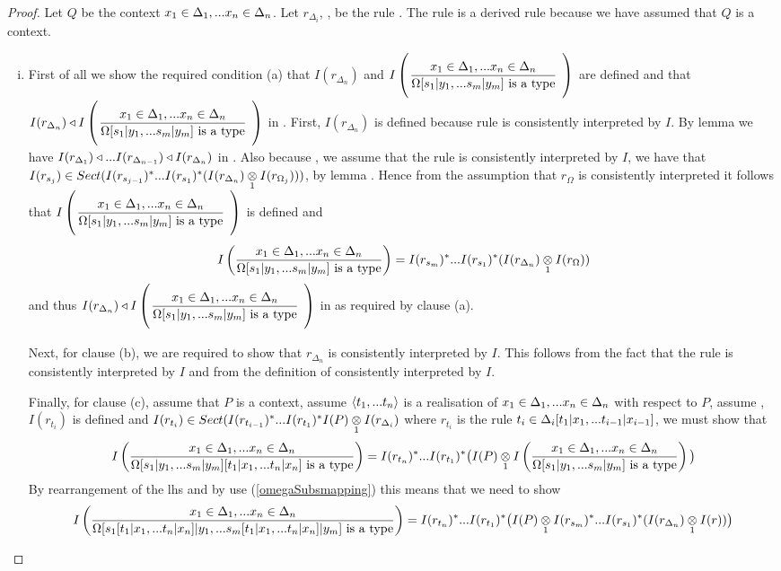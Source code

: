 \begin{proof}
Let $Q$ be the context $\xDelta{n}$. Let $r_{\Delta_i}$, \foreachi, be the rule .
\newcommand{\targetruleone}{\gatdisplayrule{\xDelta{n}}{\isT{\Omega[\SUBsFORy{m}]}}}
\newcommand{\Qtargetruleone}{\gatdisplayrule{\xDelta{n}}{\isT{\Omega[\SUBsFORy{m}]}}}
The rule  is a derived rule because we have assumed that $Q$ is a context. 
\begin{enumerate}[(i)]
\item
First of all we show the required condition (a) that $I(r_{\Delta_n})$ 
and $\Imap{\Qtargetruleone}$ are defined and that 
$I(r_{\Delta_n}) \base \Imap{\Qtargetruleone}$ in \catc. 
First, $I(r_{\Delta_n})$ is defined because rule  is consistently interpreted by $I$. 
By  lemma  we have 
$I(r_{\Delta_1}) \base ... I(r_{\Delta_{n-1}}) \base I(r_{\Delta_n})$ in \catc.
Also because \foreachj,  we assume that the rule  is consistently interpreted by $I$, 
we have that $I(r_{s_j}) \in Sect(I(r_{s_{j-1}})^*...I(r_{s_1})^*(\crossx{I(r_{\Delta_n})}{I(r_{\Omega_j})}{1}))$, by lemma . Hence 
from the assumption that $r_\Omega$ is consistently interpreted it follows that $\Imap{\Qtargetruleone}$ is defined and 
\begin{equation}
\label{omegaSubsmapping}
\Imappedrule{\xDelta{n}}{\isT{\Omega[\SUBsFORy{m}]}} 
= I(r_{s_m})^*...I(r_{s_1})^*(\crossx{I(r_{\Delta_n})}{I(r_\Omega)}{1})
\end{equation}
and thus $I(r_{\Delta_n}) \base \Imap{\Qtargetruleone}$ in \catcw as required by clause (a).

Next, for clause (b), we are required to show that $r_{\Delta_n}$ is consistently interpreted by $I$. 
This follows from the fact that 
the rule   is consistently interpreted by $I$ 
and from the definition of consistently interpreted by $I$.

Finally, for clause (c), assume that $P$ is a context,
assume $\tuple{\tn}$ is a realisation of $\xDelta{n}$ with respect to $P$, 
assume \foreachi, $I(r_{t_i})$ is defined and $I(r_{t_i}) \in Sect(I(r_{t_{i-1}})^* ... I(r_{t_1})^*\crossx{I(P)}{I(r_{\Delta_i})}{1}$ 
where $r_{t_i}$ is the rule $\tDelta{i}$, 
we must show that
$$\Imappedrule{\xDelta{n}}{\isT{\Omega[\SUBsFORy{m}][\SUBtFORx{n}]}}
                =I(r_{t_n})^* ... I(r_{t_1})^*\big(\crossx{I(P)}{\Imappedrule{\xDelta{n}}{\isT{\Omega[\SUBsFORy{m}]}}}{1}\big)$$
By rearrangement of the lhs and by use (\ref{omegaSubsmapping}) this means that we need to show 
\begin{equation}
\label{ctarget}
\Imappedrule{\xDelta{n}}{\isT{\Omega[s_1[\SUBtFORx{n}]|y_1,... s_m[\SUBtFORx{n}]|y_m]}}
                =I(r_{t_n})^* ... I(r_{t_1})^*\big(\crossx{I(P)}{I(r_{s_m})^*...I(r_{s_1})^*(\crossx{I(r_{\Delta_n})}{I(r)}{1})}{1}\big)
\end{equation}


\end{enumerate}
\end{proof}
